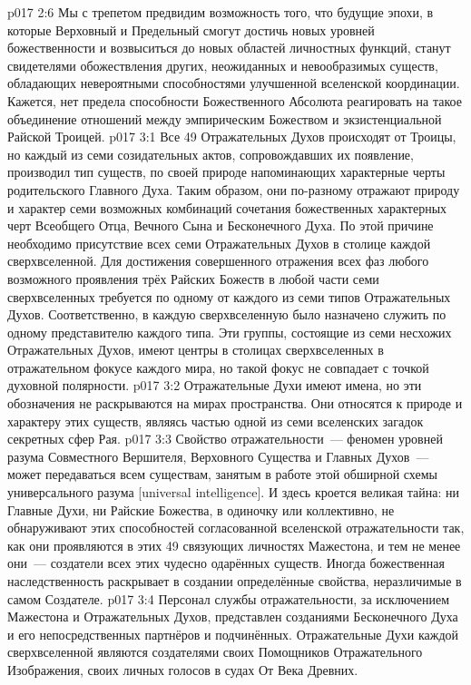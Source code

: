 \vs p017 2:6 Мы с трепетом предвидим возможность того, что будущие эпохи, в которые Верховный и Предельный смогут достичь новых уровней божественности и возвыситься до новых областей личностных функций, станут свидетелями обожествления других, неожиданных и невообразимых существ, обладающих невероятными способностями улучшенной вселенской координации. Кажется, нет предела способности Божественного Абсолюта реагировать на такое объединение отношений между эмпирическим Божеством и экзистенциальной Райской Троицей.
\vs p017 3:1 Все 49 Отражательных Духов происходят от Троицы, но каждый из семи созидательных актов, сопровождавших их появление, производил тип существ, по своей природе напоминающих характерные черты родительского Главного Духа. Таким образом, они по\hyp{}разному отражают природу и характер семи возможных комбинаций сочетания божественных характерных черт Всеобщего Отца, Вечного Сына и Бесконечного Духа. По этой причине необходимо присутствие всех семи Отражательных Духов в столице каждой сверхвселенной. Для достижения совершенного отражения всех фаз любого возможного проявления трёх Райских Божеств в любой части семи сверхвселенных требуется по одному от каждого из семи типов Отражательных Духов. Соответственно, в каждую сверхвселенную было назначено служить по одному представителю каждого типа. Эти группы, состоящие из семи несхожих Отражательных Духов, имеют центры в столицах сверхвселенных в отражательном фокусе каждого мира, но такой фокус не совпадает с точкой духовной полярности.
\vs p017 3:2 Отражательные Духи имеют имена, но эти обозначения не раскрываются на мирах пространства. Они относятся к природе и характеру этих существ, являясь частью одной из семи вселенских загадок секретных сфер Рая.
\vs p017 3:3 Свойство отражательности~--- феномен уровней разума Совместного Вершителя, Верховного Существа и Главных Духов~--- может передаваться всем существам, занятым в работе этой обширной схемы универсального разума [universal intelligence]. И здесь кроется великая тайна: ни Главные Духи, ни Райские Божества, в одиночку или коллективно, не обнаруживают этих способностей согласованной вселенской отражательности так, как они проявляются в этих 49 связующих личностях Мажестона, и тем не менее они~--- создатели всех этих чудесно одарённых существ. Иногда божественная наследственность раскрывает в создании определённые свойства, неразличимые в самом Создателе.
\vs p017 3:4 Персонал службы отражательности, за исключением Мажестона и Отражательных Духов, представлен созданиями Бесконечного Духа и его непосредственных партнёров и подчинённых. Отражательные Духи каждой сверхвселенной являются создателями своих Помощников Отражательного Изображения, своих личных голосов в судах От Века Древних.
